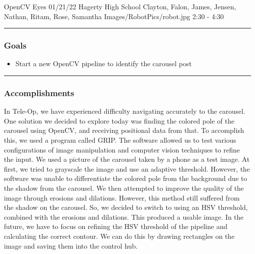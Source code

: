 \insertmeeting 
	{OpenCV Eyes} 
	{01/21/22} 
	{Hagerty High School}
	{Clayton, Falon, James, Jensen, Nathan, Ritam, Rose, Samantha}
	{Images/RobotPics/robot.jpg}
	{2:30 - 4:30}
	
\noindent\hfil\rule{\textwidth}{.4pt}\hfil
\subsubsection*{Goals}
\begin{itemize}
    \item Start a new OpenCV pipeline to identify the carousel post 

\end{itemize} 

\noindent\hfil\rule{\textwidth}{.4pt}\hfil

\subsubsection*{Accomplishments}
In Tele-Op, we have experienced difficulty navigating accurately to the carousel. One solution we decided to explore today was finding the colored pole of the carousel using OpenCV, and receiving positional data from that. To accomplish this, we used a program called GRIP. The software allowed us to test various configurations of image manipulation and computer vision techniques to refine the input. We used a picture of the carousel taken by a phone as a test image. At first, we tried to grayscale the image and use an adaptive threshold. However, the software was unable to differentiate the colored pole from the background due to the shadow from the carousel. We then attempted to improve the quality of the image through erosions and dilations. However, this method still suffered from the shadow on the carousel. So, we decided to switch to using an HSV threshold, combined with the erosions and dilations. This produced a usable image. In the future, we have to focus on refining the HSV threshold of the pipeline and calculating the correct contour. We can do this by drawing rectangles on the image and saving them into the control hub. 

